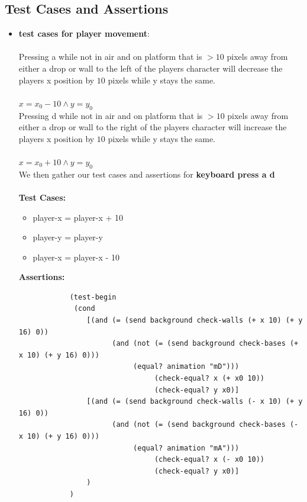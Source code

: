 \documentclass{article}
\begin{document}
	\subsection{Test Cases and Assertions}
	\begin{itemize}
		\item {\large \textbf{test cases for player movement}:} \\ \\
			Pressing a while not in air and on platform that is $> 10$ pixels away from
			either a drop or wall to the left of the players character will decrease the players
			x position by $10$ pixels while y stays the same. \\ \\
			$x = x_0 - 10 \land y = y_0$ \\
			
			Pressing d while not in air and on platform that is $>  10$ pixels away from 
			either a drop or wall to the right of the players character will increase the players 
			x position by $10$ pixels while y stays the same. \\ \\
			$x = x_0 + 10 \land y = y_0$ \\
			
			We then gather our test cases and assertions for \textbf{keyboard press a d} \\ \\
			\textbf{Test Cases:}
			\begin{itemize}
				\item \quad player-x = player-x + 10
				\item \quad player-y = player-y
				\item \quad player-x = player-x - 10
			\end{itemize}
			\textbf{Assertions:}
			\begin{lstlisting}
     		(test-begin
			 (cond
				[(and (= (send background check-walls (+ x 10) (+ y 16) 0))
					  (and (not (= (send background check-bases (+ x 10) (+ y 16) 0)))
						   (equal? animation "mD")))
								(check-equal? x (+ x0 10))
								(check-equal? y x0)]
				[(and (= (send background check-walls (- x 10) (+ y 16) 0))
					  (and (not (= (send background check-bases (- x 10) (+ y 16) 0)))
						   (equal? animation "mA")))
								(check-equal? x (- x0 10))
								(check-equal? y x0)]
				)
			)
			\end{lstlisting}
			

\end{itemize}
\end{document}
